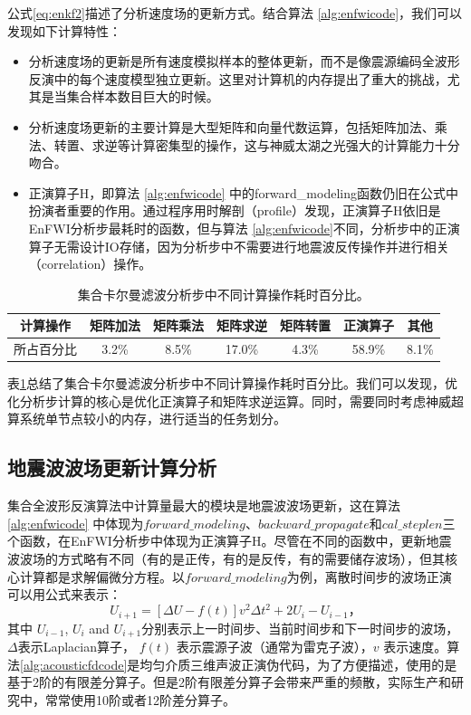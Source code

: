 \documentclass[degree=doctor]{thuthesis}
\begin{document}
公式\ref{eq:enkf2}描述了分析速度场的更新方式。结合算法 \ref{alg:enfwicode}，我们可以发现如下计算特性：
\begin{itemize}
  \item 分析速度场的更新是所有速度模拟样本的整体更新，而不是像震源编码全波形反演中的每个速度模型独立更新。这里对计算机的内存提出了重大的挑战，尤其是当集合样本数目巨大的时候。
  \item 分析速度场更新的主要计算是大型矩阵和向量代数运算，包括矩阵加法、乘法、转置、求逆等计算密集型的操作，这与神威太湖之光强大的计算能力十分吻合。
  \item 正演算子$\mbox{H}$，即算法 \ref{alg:enfwicode} 中的forward\_modeling函数仍旧在公式中扮演者重要的作用。通过程序用时解剖（profile）发现，正演算子$\mbox{H}$依旧是EnFWI分析步最耗时的函数，但与算法 \ref{alg:enfwicode}不同，分析步中的正演算子无需设计IO存储，因为分析步中不需要进行地震波反传操作并进行相关（correlation）操作。
\end{itemize}

\begin{table}[ht]
\centering
\caption{集合卡尔曼滤波分析步中不同计算操作耗时百分比。}
\label{tb:enkfprofile}
\begin{tabular}{ccccccc}
\hline
计算操作  & 矩阵加法  & 矩阵乘法  & 矩阵求逆   & 矩阵转置  & 正演算子   & 其他    \\\hline
所占百分比 & 3.2\% & 8.5\% & 17.0\% & 4.3\% & 58.9\% & 8.1\% \\\hline
\end{tabular}
\end{table}
表\ref{tb:enkfprofile}总结了集合卡尔曼滤波分析步中不同计算操作耗时百分比。我们可以发现，优化分析步计算的核心是优化正演算子和矩阵求逆运算。同时，需要同时考虑神威超算系统单节点较小的内存，进行适当的任务划分。

\subsection{地震波波场更新计算分析}
集合全波形反演算法中计算量最大的模块是地震波波场更新，这在算法 \ref{alg:enfwicode} 中体现为$forward\_modeling$、$backward\_propagate$和$cal\_steplen$三个函数，在EnFWI分析步中体现为正演算子$\mbox{H}$。尽管在不同的函数中，更新地震波波场的方式略有不同（有的是正传，有的是反传，有的需要储存波场），但其核心计算都是求解偏微分方程。以$forward\_modeling$为例，离散时间步的波场正演可以用公式来表示：
\begin{equation}
\label{eq:enfwifd}
U_{i+1} = \left[ \Delta U -f(t) \right] v^2 \Delta t^2 + 2 U_{i} - U_{i-1}，
\end{equation}
其中 $U_{i-1}$, $U_{i}$ and $U_{i+1}$分别表示上一时间步、当前时间步和下一时间步的波场，$\Delta$表示Laplacian算子，
$f(t)$ 表示震源子波（通常为雷克子波），$v$ 表示速度。算法\ref{alg:acousticfdcode}是均匀介质三维声波正演伪代码，为了方便描述，使用的是基于2阶的有限差分算子\cite{fu2011eliminating}。但是2阶有限差分算子会带来严重的频散，实际生产和研究中，常常使用10阶或者12阶差分算子。
\end{document}
